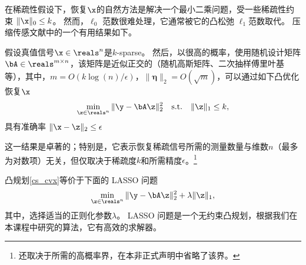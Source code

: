在稀疏性假设下，恢复$\x$的自然方法是解决一个最小二乘问题，受一些稀疏性约束 $\|\x\|_0 \le k$。
然而，$\ell_0$ 范数很难处理，它通常被它的凸松弛 $\ell_1$范数取代。
压缩传感文献中的一个有用结果如下。
\begin{proposition}
\label{cs_prop}
假设真值信号$\x \in \reals^n$是$k$-sparse。
然后，以很高的概率，使用随机设计矩阵 $\bA \in \reals^{m \times n}$，该矩阵是近似正交的（随机高斯矩阵、二次抽样傅里叶基等），其中，$m = O(k \log(n) / \epsilon)$，$\|\pmb{\eta}\|_2 = O(\sqrt{m})$，可以通过如下凸优化恢复$\x$
\begin{equation}
\label{cs_cvx}
\min_{\z \in \reals^n} \|\y - \bA \z\|_2^2 \quad {\rm s.t.} \quad \|\z\|_1 \le k,
\end{equation}
具有准确率 $\|\x - \z\|_2 \le \epsilon$
\end{proposition}
这一结果是卓著的；特别是，它表示恢复稀疏信号所需的测量数量与维数$n$（最多为对数项）无关，但仅取决于稀疏度$k$和所需精度$\epsilon$。\footnote{还取决于所需的高概率界，在本非正式声明中省略了该界。}
\begin{remark}
	凸规划\eqref{cs_cvx}等价于下面的 LASSO 问题
	$$
	\min_{\z \in \reals^n} \|\y - \bA \z\|_2^2 + \lambda \|\z\|_1,
	$$
	其中，选择适当的正则化参数$\lambda$。
	LASSO 问题是一个无约束凸规划，根据我们在本课程中研究的算法，它有高效的求解器。
\end{remark}


